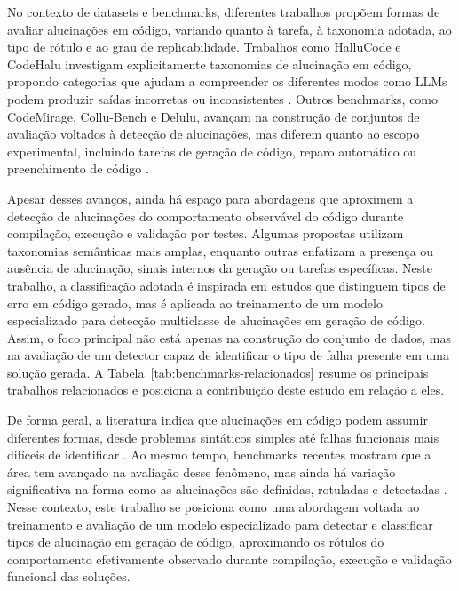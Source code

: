 \documentclass[conference]{IEEEtran}
\begin{document}
No contexto de datasets e benchmarks, diferentes trabalhos propõem formas de avaliar alucinações em código, variando quanto à tarefa, à taxonomia adotada, ao tipo de rótulo e ao grau de replicabilidade. Trabalhos como HalluCode e CodeHalu investigam explicitamente taxonomias de alucinação em código, propondo categorias que ajudam a compreender os diferentes modos como LLMs podem produzir saídas incorretas ou inconsistentes \cite{2404.00971,2405.00253}. Outros benchmarks, como CodeMirage, Collu-Bench e Delulu, avançam na construção de conjuntos de avaliação voltados à detecção de alucinações, mas diferem quanto ao escopo experimental, incluindo tarefas de geração de código, reparo automático ou preenchimento de código \cite{2408.08333,2410.09997,2605.07024}.

Apesar desses avanços, ainda há espaço para abordagens que aproximem a detecção de alucinações do comportamento observável do código durante compilação, execução e validação por testes. Algumas propostas utilizam taxonomias semânticas mais amplas, enquanto outras enfatizam a presença ou ausência de alucinação, sinais internos da geração ou tarefas específicas. Neste trabalho, a classificação adotada é inspirada em estudos que distinguem tipos de erro em código gerado, mas é aplicada ao treinamento de um modelo especializado para detecção multiclasse de alucinações em geração de código. Assim, o foco principal não está apenas na construção do conjunto de dados, mas na avaliação de um detector capaz de identificar o tipo de falha presente em uma solução gerada. A Tabela~\ref{tab:benchmarks-relacionados} resume os principais trabalhos relacionados e posiciona a contribuição deste estudo em relação a eles.

De forma geral, a literatura indica que alucinações em código podem assumir diferentes formas, desde problemas sintáticos simples até falhas funcionais mais difíceis de identificar \cite{2407.06153,2504.20799}. Ao mesmo tempo, benchmarks recentes mostram que a área tem avançado na avaliação desse fenômeno, mas ainda há variação significativa na forma como as alucinações são definidas, rotuladas e detectadas \cite{2404.00971,2405.00253,2408.08333,2410.09997,2605.07024}. Nesse contexto, este trabalho se posiciona como uma abordagem voltada ao treinamento e avaliação de um modelo especializado para detectar e classificar tipos de alucinação em geração de código, aproximando os rótulos do comportamento efetivamente observado durante compilação, execução e validação funcional das soluções.
\end{document}
